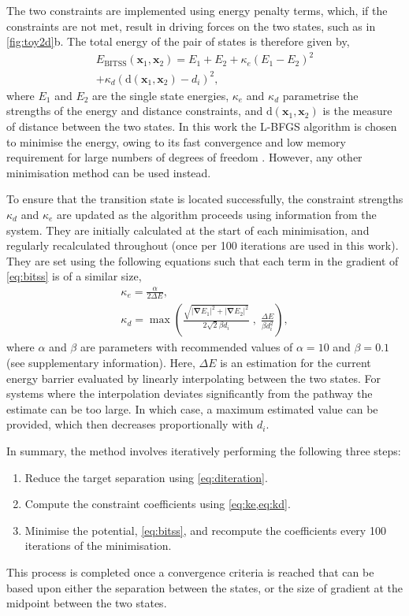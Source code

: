 \documentclass[aps,prl,twocolumn,groupedaddress]{revtex4}
\begin{document}
\topic The two constraints are implemented using energy penalty terms, which, if the constraints are not met, result in driving forces on the two states, such as in \cref{fig:toy2d}b.
The total energy of the pair of states is therefore given by,
\begin{multline}\label{eq:bitss}
  E_\text{BITSS}(\bm{x}_1, \bm{x}_2) = E_1 + E_2
    + \kappa_e \left( E_1 - E_2 \right) ^2 \\
    + \kappa_d \left( \mathrm{d}(\bm{x}_1, \bm{x}_2) - d_i \right) ^2,
\end{multline}
where $E_1$ and $E_2$ are the single state energies, $\kappa_e$ and $\kappa_d$ parametrise the strengths of the energy and distance constraints, and $\mathrm{d}(\bm{x}_1, \bm{x}_2)$ is the measure of distance between the two states.
In this work the L-BFGS algorithm is chosen to minimise the energy, owing to its fast convergence and low memory requirement for large numbers of degrees of freedom \cite{Liu1989}.
However, any other minimisation method can be used instead.

\topic To ensure that the transition state is located successfully, the constraint strengths $\kappa_d$ and $\kappa_e$ are updated as the algorithm proceeds using information from the system.
They are initially calculated at the start of each minimisation, and regularly recalculated throughout (once per 100 iterations are used in this work).
They are set using the following equations such that each term in the gradient of \cref{eq:bitss} is of a similar size,
\begin{gather}
  \kappa_e = \frac {\alpha} {2 \Delta E},
  \label{eq:ke}
  \\
  \kappa_d = \max \left(
    \frac {\sqrt{|\bm{\nabla} E_1|^2 + |\bm{\nabla} E_2|^2}} {2\sqrt{2} \beta d_i} \; , \;
    \frac{\Delta E}{\beta d_i^2} \right),
  \label{eq:kd}
\end{gather}
where $\alpha$ and $\beta$ are parameters with recommended values of $\alpha = 10$ and $\beta = 0.1$ (see supplementary information).
Here, $\Delta E$ is an estimation for the current energy barrier evaluated by linearly interpolating between the two states.
For systems where the interpolation deviates significantly from the pathway the estimate can be too large.
In which case, a maximum estimated value can be provided, which then decreases proportionally with $d_i$.

\topic In summary, the method involves iteratively performing the following three steps:
\begin{enumerate}
  \item Reduce the target separation using \cref{eq:diteration}.
  \item Compute the constraint coefficients using \cref{eq:ke,eq:kd}.
  \item Minimise the potential, \cref{eq:bitss}, and recompute the coefficients every 100 iterations of the minimisation.
\end{enumerate}
This process is completed once a convergence criteria is reached that can be based upon either the separation between the states, or the size of gradient at the midpoint between the two states.
\end{document}
